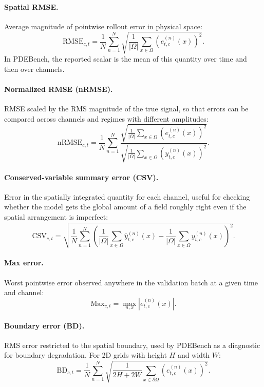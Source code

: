 \documentclass[11pt]{article}
\begin{document}
\paragraph{Spatial RMSE.}
Average magnitude of pointwise rollout error in physical space:
\[
\mathrm{RMSE}_{c,t}
=
\frac{1}{N}\sum_{n=1}^{N}
\sqrt{
\frac{1}{|\Omega|}
\sum_{x \in \Omega}
\left(e^{(n)}_{t,c}(x)\right)^2
}.
\]
In PDEBench, the reported scalar is the mean of this quantity over time and then over channels.

\paragraph{Normalized RMSE (nRMSE).}
RMSE scaled by the RMS magnitude of the true signal, so that errors can be compared across channels and regimes with different amplitudes:
\[
\mathrm{nRMSE}_{c,t}
=
\frac{1}{N}\sum_{n=1}^{N}
\frac{
\sqrt{
\frac{1}{|\Omega|}
\sum_{x \in \Omega}
\left(e^{(n)}_{t,c}(x)\right)^2
}
}{
\sqrt{
\frac{1}{|\Omega|}
\sum_{x \in \Omega}
\left(y^{(n)}_{t,c}(x)\right)^2
}
}.
\]

\paragraph{Conserved-variable summary error (CSV).}
Error in the spatially integrated quantity for each channel, useful for checking whether the model gets the global amount of a field roughly right even if the spatial arrangement is imperfect:
\[
\mathrm{CSV}_{c,t}
=
\sqrt{
\frac{1}{N}
\sum_{n=1}^{N}
\left(
\frac{1}{|\Omega|}\sum_{x \in \Omega}\hat{y}^{(n)}_{t,c}(x)
-
\frac{1}{|\Omega|}\sum_{x \in \Omega}y^{(n)}_{t,c}(x)
\right)^2
}.
\]

\paragraph{Max error.}
Worst pointwise error observed anywhere in the validation batch at a given time and channel:
\[
\mathrm{Max}_{c,t}
=
\max_{n,x}
\left|
e^{(n)}_{t,c}(x)
\right|.
\]

\paragraph{Boundary error (BD).}
RMS error restricted to the spatial boundary, used by PDEBench as a diagnostic for boundary degradation. For 2D grids with height $H$ and width $W$:
\[
\mathrm{BD}_{c,t}
=
\frac{1}{N}\sum_{n=1}^{N}
\sqrt{
\frac{1}{2H+2W}
\sum_{x \in \partial \Omega}
\left(e^{(n)}_{t,c}(x)\right)^2
}.
\]
\end{document}
